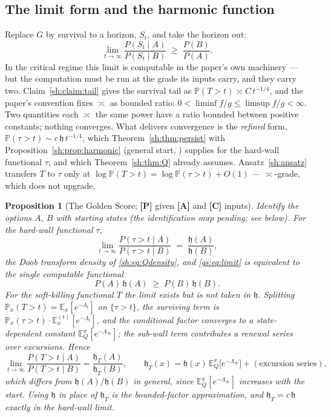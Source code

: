 \documentclass[11pt]{article}
\numberwithin{equation}{section}
\theoremstyle{plain}
\newtheorem{proposition}[theorem]{Proposition}
\theoremstyle{definition}
\theoremstyle{remark}
\newcommand{\E}{\mathbb{E}}
\newcommand{\PP}{\mathbb{P}}
\newcommand{\hm}{\mathfrak{h}}
\begin{document}
\subsection{The limit form and the harmonic function}\label{gs:sub:limit}

Replace $G$ by survival to a horizon, $S_t$, and take the horizon out:
\begin{equation}\label{gs:eq:limit}
    \lim_{t \to \infty} \frac{P(S_t \mid A)}{P(S_t \mid B)} \;\ge\; \frac{P(B)}{P(A)}.
\end{equation}
In the critical regime this limit is computable in the paper's own machinery --- but the computation must be run at the grade its inputs carry, and they carry two. Claim~\ref{sh:claim:tail} gives the survival tail as $\PP(T > t) \asymp C\,t^{-1/4}$, and the paper's convention fixes $\asymp$ as bounded ratio: $0 < \liminf f/g \le \limsup f/g < \infty$. Two quantities each $\asymp$ the same power have a ratio bounded between positive constants; nothing converges. What delivers convergence is the \emph{refined} form, $\PP(\tau > t) \sim c\,\hm\,t^{-1/4}$, which Theorem~\ref{sh:thm:persist} with Proposition~\ref{sh:prop:harmonic} (general start, \cite{GJW99}) supplies for the hard-wall functional $\tau$, and which Theorem~\ref{sh:thm:Q} already assumes. Ansatz~\ref{sh:ansatz} transfers $T$ to $\tau$ only at $\log \PP(T>t) = \log \PP(\tau>t) + O(1)$ --- $\asymp$-grade, which does not upgrade.

\begin{proposition}[The Golden Score; \textbf{[P]} given \textbf{[A]} and \textbf{[C]} inputs]\label{gs:prop:score}
Identify the options $A$, $B$ with starting states (the identification map pending; see below). For the hard-wall functional $\tau$,
\begin{equation}\label{gs:eq:harmonic}
    \lim_{t \to \infty} \frac{P(\tau > t \mid A)}{P(\tau > t \mid B)} \;=\; \frac{\hm(A)}{\hm(B)},
\end{equation}
the Doob transform density of \eqref{sh:eq:Qdensity}, and \eqref{gs:eq:limit} is equivalent to the single computable functional
\begin{equation}\label{gs:eq:functional}
    P(A)\,\hm(A) \;\ge\; P(B)\,\hm(B).
\end{equation}
For the soft-killing functional $T$ the limit exists but is \emph{not} taken in $\hm$. Splitting $\PP_x(T>t)=\E_x[e^{-\Lambda_t}]$ on $\{\tau>t\}$, the surviving term is $\PP_x(\tau>t)\cdot\E^{(t)}_x[e^{-\Lambda_t}]$, and the conditional factor converges to a \emph{state-dependent} constant $\E^x_Q[e^{-\Lambda_\infty}]$; the sub-wall term contributes a renewal series over excursions. Hence
\begin{equation}\label{gs:eq:hT}
\lim_{t\to\infty}\frac{P(T>t\mid A)}{P(T>t\mid B)}=\frac{\hm_T(A)}{\hm_T(B)},
\qquad
\hm_T(x)=\hm(x)\,\E^x_Q\bigl[e^{-\Lambda_\infty}\bigr]+(\text{excursion series}),
\end{equation}
which differs from $\hm(A)/\hm(B)$ in general, since $\E^x_Q[e^{-\Lambda_\infty}]$ increases with the start. Using $\hm$ in place of $\hm_T$ is the bounded-factor approximation, and $\hm_T=c\,\hm$ exactly in the hard-wall limit.
\end{proposition}
\end{document}
